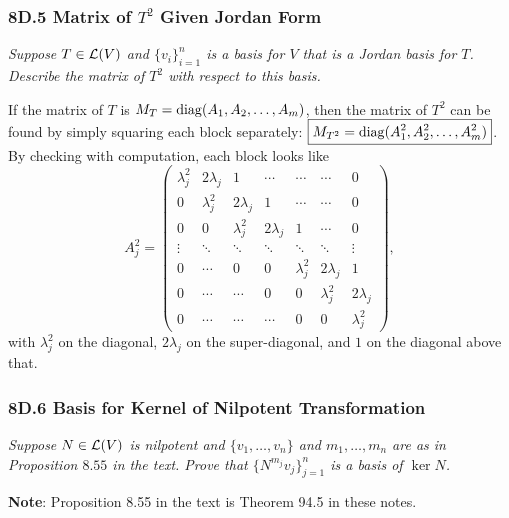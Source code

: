 \documentclass{article}
\begin{document}
\subsubsection*{8D.5 Matrix of $T^2$ Given Jordan Form}
\textit{Suppose $T\in\mathcal L(V)$ and $\{v_i\}_{i=1}^n$ is a basis for $V$ that is a Jordan basis for $T$. Describe the matrix of $T^2$ with respect to this basis.}
\begin{solution}
If the matrix of $T$ is $M_T = \operatorname{diag}(A_1, A_2,\ldots, A_m)$, then the matrix of $T^2$ can be found by simply squaring each block separately: $\boxed{M_{T^2} = \operatorname{diag}(A_1^2, A_2^2, \ldots, A_m^2)}$. By checking with computation, each block looks like
$$A_j^2 = \begin{pmatrix}
\lambda_j^2 & 2\lambda_j & 1 & \cdots & \cdots & \cdots & 0 \\
0 & \lambda_j^2 & 2\lambda_j & 1 & \cdots & \cdots & 0\\
0 & 0 & \lambda_j^2 & 2\lambda_j & 1 & \cdots & 0 \\
\vdots & \ddots & \ddots & \ddots & \ddots & \ddots & \vdots \\
0 & \cdots & 0 & 0 & \lambda_j^2 & 2\lambda_j & 1\\
0& \cdots & \cdots &0 & 0 & \lambda_j^2 & 2\lambda_j \\
0 & \cdots & \cdots & \cdots & 0 & 0 & \lambda_j^2
\end{pmatrix},$$
with $\lambda_j^2$ on the diagonal, $2\lambda_j$ on the super-diagonal, and $1$ on the diagonal above that.
\end{solution}
\subsubsection*{8D.6 Basis for Kernel of Nilpotent Transformation}
\textit{Suppose $N\in\mathcal L(V)$ is nilpotent and $\{v_1,\ldots, v_n\}$ and $m_1,\ldots, m_n$ are as in Proposition $8.55$ in the text. Prove that $\{N^{m_j}v_j\}_{j=1}^n$ is a basis of $\ker N$.}
\vspace{0.2 cm}

\textbf{Note}: Proposition 8.55 in the text is Theorem 94.5 in these notes.
\end{document}
